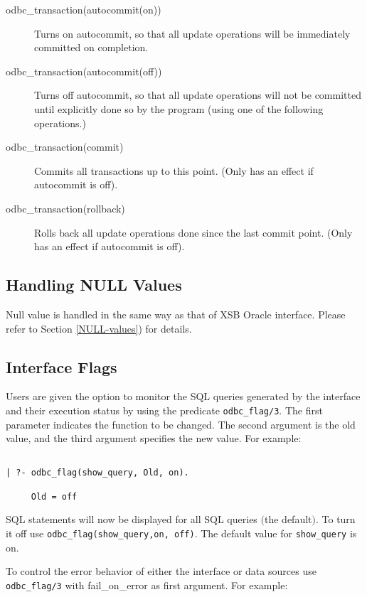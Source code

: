 \begin{description}
\item[odbc\_transaction(autocommit(on))]
	Turns on autocommit, so that all update operations will be
	immediately committed on completion.
\item[odbc\_transaction(autocommit(off))]
	Turns off autocommit, so that all update operations will not
	be committed until explicitly done so by the program (using
	one of the following operations.)
\item[odbc\_transaction(commit)]
        Commits all transactions up to this point.  (Only has an
        effect if autocommit is off).
\item[odbc\_transaction(rollback)]
        Rolls back all update operations done since the last commit
        point.  (Only has an effect if autocommit is off).
\end{description}

\subsection{Handling NULL Values}
Null value is handled in the same way as that of XSB Oracle interface.
Please refer to Section \ref{NULL-values}) for details.

\subsection{Interface Flags}

Users are given the option to monitor the SQL queries generated 
by the interface and their execution status by using the 
predicate {\tt odbc\_flag/3}.  The first parameter indicates the function  to be
changed.  The second argument is the old value, and the third argument specifies
the new value.  For example:
\begin{verbatim}

| ?- odbc_flag(show_query, Old, on).

     Old = off
\end{verbatim}

SQL statements will now be displayed for all SQL queries $($the default$)$.
To turn it off use {\tt odbc\_flag(show\_query,on, off)}.  The default value 
for {\tt show\_query} is on.

To control the error behavior of either the interface or
data sources use {\tt odbc\_flag/3} with fail\_on\_error as first argument.
For example:

